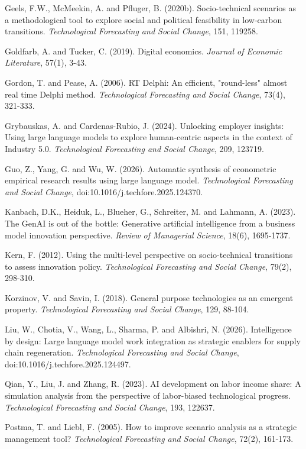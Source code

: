 \documentclass{article}
\begin{document}
Geels, F.W., McMeekin, A. and Pfluger, B. (2020b). Socio-technical scenarios as a methodological tool to explore social and political feasibility in low-carbon transitions. \textit{Technological Forecasting and Social Change}, 151, 119258.

Goldfarb, A. and Tucker, C. (2019). Digital economics. \textit{Journal of Economic Literature}, 57(1), 3-43.

Gordon, T. and Pease, A. (2006). RT Delphi: An efficient, "round-less" almost real time Delphi method. \textit{Technological Forecasting and Social Change}, 73(4), 321-333.

Grybauskas, A. and Cardenas-Rubio, J. (2024). Unlocking employer insights: Using large language models to explore human-centric aspects in the context of Industry 5.0. \textit{Technological Forecasting and Social Change}, 209, 123719.

Guo, Z., Yang, G. and Wu, W. (2026). Automatic synthesis of econometric empirical research results using large language model. \textit{Technological Forecasting and Social Change}, doi:10.1016/j.techfore.2025.124370.

Kanbach, D.K., Heiduk, L., Blueher, G., Schreiter, M. and Lahmann, A. (2023). The GenAI is out of the bottle: Generative artificial intelligence from a business model innovation perspective. \textit{Review of Managerial Science}, 18(6), 1695-1737.

Kern, F. (2012). Using the multi-level perspective on socio-technical transitions to assess innovation policy. \textit{Technological Forecasting and Social Change}, 79(2), 298-310.

Korzinov, V. and Savin, I. (2018). General purpose technologies as an emergent property. \textit{Technological Forecasting and Social Change}, 129, 88-104.

Liu, W., Chotia, V., Wang, L., Sharma, P. and Albishri, N. (2026). Intelligence by design: Large language model work integration as strategic enablers for supply chain regeneration. \textit{Technological Forecasting and Social Change}, doi:10.1016/j.techfore.2025.124497.

Qian, Y., Liu, J. and Zhang, R. (2023). AI development on labor income share: A simulation analysis from the perspective of labor-biased technological progress. \textit{Technological Forecasting and Social Change}, 193, 122637.

Postma, T. and Liebl, F. (2005). How to improve scenario analysis as a strategic management tool? \textit{Technological Forecasting and Social Change}, 72(2), 161-173.
\end{document}
